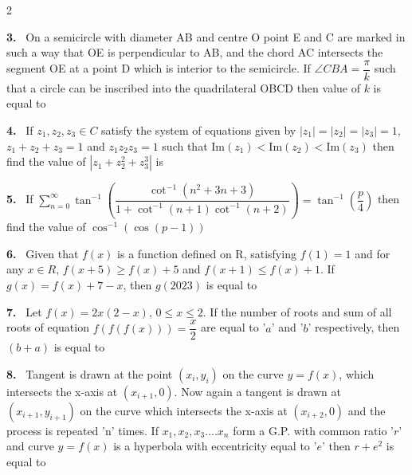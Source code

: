 \documentclass[10pt]{extarticle}
\newcommand{\qn}[1]{\par\smallskip\noindent\textbf{#1.}~}
\begin{document}
\begin{multicols}{2}
\qn{3} On a semicircle with diameter AB and centre O point E and C are marked in such a way that OE is perpendicular to AB, and the chord AC intersects the segment OE at a point D which is interior to the semicircle. If $\angle CBA=\dfrac{\pi}{k}$ such that a circle can be inscribed into the quadrilateral OBCD then value of $k$ is equal to
\qn{4} If $z_1,z_2,z_3\in C$ satisfy the system of equations given by $|z_1|=|z_2|=|z_3|=1$, $z_1+z_2+z_3=1$ and $z_1z_2z_3=1$ such that $\mathrm{Im}(z_1)<\mathrm{Im}(z_2)<\mathrm{Im}(z_3)$ then find the value of $\left|z_1+z_2^2+z_3^3\right|$ is \underline{\hspace{1.5cm}}
\qn{5} If $\displaystyle\sum_{n=0}^{\infty}\tan^{-1}\left(\dfrac{\cot^{-1}\left(n^2+3n+3\right)}{1+\cot^{-1}(n+1)\cot^{-1}(n+2)}\right)=\tan^{-1}\left(\dfrac p4\right)$ then find the value of $\cos^{-1}(\cos(p-1))$\par
[Use : $\pi=3.14$]
\qn{6} Given that $f(x)$ is a function defined on R, satisfying $f(1)=1$ and for any $x\in R$, $f(x+5)\ge f(x)+5$ and $f(x+1)\le f(x)+1$. If $g(x)=f(x)+7-x$, then $g(2023)$ is equal to \underline{\hspace{1.5cm}}
\qn{7} Let $f(x)=2x(2-x)$, $0\le x\le2$. If the number of roots and sum of all roots of equation $f(f(f(x)))=\dfrac x2$ are equal to '$a$' and '$b$' respectively, then $(b+a)$ is equal to \underline{\hspace{1.5cm}}
\qn{8} Tangent is drawn at the point $(x_i,y_i)$ on the curve $y=f(x)$, which intersects the x-axis at $(x_{i+1},0)$. Now again a tangent is drawn at $(x_{i+1},y_{i+1})$ on the curve which intersects the x-axis at $(x_{i+2},0)$ and the process is repeated 'n' times. If $x_1,x_2,x_3\ldots.x_n$ form a G.P. with common ratio '$r$' and curve $y=f(x)$ is a hyperbola with eccentricity equal to '$e$' then $r+e^2$ is equal to \underline{\hspace{1.5cm}}
\end{multicols}
\end{document}
